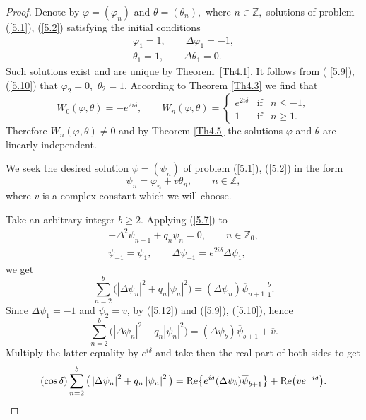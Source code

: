 \documentclass[pdftex]{sigma}
\numberwithin{equation}{section}
\begin{document}
\begin{proof}
Denote by $\varphi =(\varphi _{n})$ and $\theta =(\theta _{n}),$ where $n\in
\mathbb{Z}
,$ solutions of problem (\ref{5.1}), (\ref{5.2}) satisfying the initial
conditions%
\begin{gather}
\varphi _{1}=1,\qquad \Delta \varphi _{1}=-1,  \label{5.9}
\\
\theta _{1}=1,\qquad \Delta \theta _{1}=0.  \label{5.10}
\end{gather}%
Such solutions exist and are unique by Theorem~\ref{Th4.1}. It follows from (%
\ref{5.9}), (\ref{5.10}) that $\varphi _{2}=0,$ $\theta _{2}=1.$ According
to Theorem \ref{Th4.3} we f\/ind that%
\begin{equation}
W_{0}(\varphi ,\theta )=-e^{2i\delta },\qquad W_{n}(\varphi ,\theta
)=\left\{
\begin{array}{lll}
e^{2i\delta } & \text{if} & n\leq -1, \\
1 & \text{if} & n\geq 1.%
\end{array}%
\right.  \label{5.11}
\end{equation}%
Therefore $W_{n}(\varphi ,\theta )\neq 0$ and by Theorem \ref{Th4.5} the
solutions $\varphi $ and $\theta $ are linearly independent.

We seek the desired solution $\psi =(\psi _{n})$ of problem (\ref{5.1}), (\ref{5.2}) in the form%
\begin{equation}
\psi _{n}=\varphi _{n}+v\theta _{n},\qquad n\in
\mathbb{Z}
,  \label{5.12}
\end{equation}%
where $v$ is a complex constant which we will choose.

Take an arbitrary integer $b\geq 2$. Applying (\ref{5.7}) to%
\begin{gather*}
-\Delta ^{2}\psi _{n-1}+q_{n}\psi _{n}=0,\qquad n\in
\mathbb{Z}
_{0},
\\
\psi _{-1}=\psi _{1},\qquad \Delta \psi _{-1}=e^{2i\delta }\Delta \psi
_{1},
\end{gather*}
we get%
\begin{equation*}
\sum_{n=2}^{b}\big( \left\vert \Delta \psi _{n}\right\vert
^{2}+q_{n}\left\vert \psi _{n}\right\vert ^{2}\big) =(\Delta \psi _{n})%
\overline{\psi }_{n+1}\big|_{1}^{b}.  %
\end{equation*}%
Since $\Delta \psi _{1}=-1$ and $\psi _{2}=v$, by (\ref{5.12}) and (\ref{5.9}), (\ref{5.10}), hence%
\[
\sum_{n=2}^{b}\big( \left\vert \Delta \psi _{n}\right\vert
^{2}+q_{n}\left\vert \psi _{n}\right\vert ^{2}\big) =(\Delta \psi _{b})%
\overline{\psi }_{b+1}+\overline{v}.
\]%
Multiply the latter equality by $e^{i\delta }$ and take then the real part
of both sides to get%
\begin{equation}
(\cos \delta )\sum_{n=2}^{b}\big( \left\vert \Delta \psi _{n}\right\vert
^{2}+q_{n}\left\vert \psi _{n}\right\vert ^{2}\big) ={\rm Re}\big\{e^{i\delta
}(\Delta \psi _{b})\overline{\psi }_{b+1}\big\}+{\rm Re}\big(ve^{-i\delta }\big).
\label{5.14}
\end{equation}


\end{proof}
\end{document}
